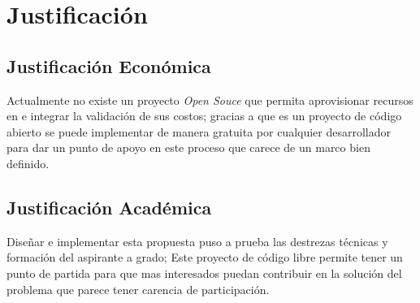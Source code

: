 \chapter{Justificación} %

\label{ch:justificacion} %


\section{Justificación Económica}
Actualmente no existe un proyecto \emph{Open Souce} que permita aprovisionar recursos en  e integrar la validación de sus costos; gracias a que \appName es un proyecto de código abierto se puede implementar de manera gratuita por cualquier desarrollador para dar un punto de apoyo en este proceso que carece de un marco bien definido.\bigskip

\section{Justificación Académica}
Diseñar e implementar esta propuesta puso a prueba las destrezas técnicas y formación del aspirante a grado; Este proyecto de código libre permite tener un punto de partida para que mas interesados puedan contribuir en la solución del problema que parece tener carencia de participación.

